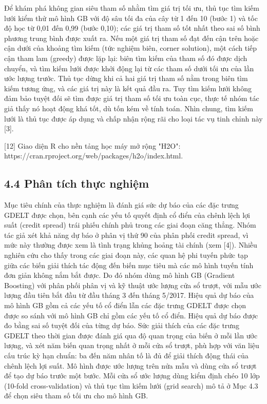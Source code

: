 Để khám phá không gian siêu tham số nhằm tìm giá trị tối ưu, thủ tục tìm kiếm lưới kiểm thử mô hình GB với độ sâu tối đa của cây từ 1 đến 10 (bước 1) và tốc độ học từ 0,01 đến 0,99 (bước 0,10); các giá trị tham số tốt nhất theo sai số bình phương trung bình được xuất ra. Nếu một giá trị tham số đạt đến cận trên hoặc cận dưới của khoảng tìm kiếm (tức nghiệm biên, corner solution), một cách tiếp cận tham lam (greedy) được lặp lại: biên tìm kiếm của tham số đó được dịch chuyển, và tìm kiếm lưới được khởi động lại từ các tham số dưới tối ưu của lần ước lượng trước. Thủ tục dừng khi cả hai giá trị tham số nằm trong biên tìm kiếm tương ứng, và các giá trị này là kết quả đầu ra. Tuy tìm kiếm lưới không đảm bảo tuyệt đối sẽ tìm được giá trị tham số tối ưu toàn cục, thực tế nhóm tác giả thấy nó hoạt động khá tốt, dù tốn kém về tính toán. Nhìn chung, tìm kiếm lưới là thủ tục được áp dụng và chấp nhận rộng rãi cho loại tác vụ tinh chỉnh này {[}3{]}.

{[}12{]} Giao diện R cho nền tảng học máy mở rộng "H2O": https://cran.rproject.org/web/packages/h2o/index.html.

\subsection{4.4 Phân tích thực nghiệm}

Mục tiêu chính của thực nghiệm là đánh giá sức dự báo của các đặc trưng GDELT được chọn, bên cạnh các yếu tố quyết định cổ điển của chênh lệch lợi suất (credit spread) trái phiếu chính phủ trong các giai đoạn căng thẳng. Nhóm tác giả xét khả năng dự báo ở phân vị thứ 90 của phân phối credit spread, vì mức này thường được xem là tình trạng khủng hoảng tài chính (xem {[}4{]}). Nhiều nghiên cứu cho thấy trong các giai đoạn này, các quan hệ phi tuyến phức tạp giữa các biến giải thích tác động đến biến mục tiêu mà các mô hình tuyến tính đơn giản không nắm bắt được. Do đó nhóm dùng mô hình GB (Gradient Boosting) với phân phối phân vị và kỹ thuật ước lượng cửa sổ trượt, với mẫu ước lượng đầu tiên bắt đầu từ đầu tháng 3 đến tháng 5/2017. Hiệu quả dự báo của mô hình GB gồm cả các yếu tố cổ điển lẫn các đặc trưng GDELT được chọn được so sánh với mô hình GB chỉ gồm các yếu tố cổ điển. Hiệu quả dự báo được đo bằng sai số tuyệt đối của từng dự báo. Sức giải thích của các đặc trưng GDELT theo thời gian được đánh giá qua độ quan trọng của biến ở mỗi lần ước lượng, và xét năm biến quan trọng nhất ở mỗi cửa sổ trượt, phù hợp với văn liệu cấu trúc kỳ hạn chuẩn: ba đến năm nhân tố là đủ để giải thích động thái của chênh lệch lợi suất. Mô hình được ước lượng trên nửa mẫu và dùng cửa sổ trượt để tạo dự báo trước một bước. Mỗi cửa sổ ước lượng dùng kiểm định chéo 10 lớp (10-fold cross-validation) và thủ tục tìm kiếm lưới (grid search) mô tả ở Mục 4.3 để chọn siêu tham số tối ưu cho mô hình GB.

